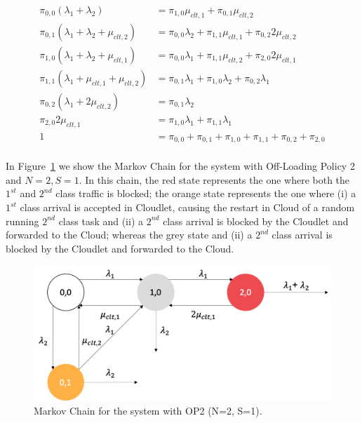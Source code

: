 \begin{equation}
	\begin{split}
		\pi_{0,0}(\lambda_{1}+\lambda_{2})& = \pi_{1,0}\mu_{clt,1}+\pi_{0,1}\mu_{clt,2} \\
		\pi_{0,1}(\lambda_{1}+\lambda_{2}+\mu_{clt,2}) & = \pi_{0,0}\lambda_{2}+\pi_{1,1}\mu_{clt,1}+\pi_{0,2}2\mu_{clt,2} \\
		\pi_{1,0}(\lambda_{1}+\lambda_{2}+\mu_{clt,1}) & = \pi_{0,0}\lambda_{1}+\pi_{1,1}\mu_{clt,2}+\pi_{2,0}2\mu_{clt,1} \\
		\pi_{1,1}(\lambda_{1}+\mu_{clt,1}+\mu_{clt,2}) & = \pi_{0,1}\lambda_{1}+\pi_{1,0}\lambda_{2}+\pi_{0,2}\lambda_{1} \\
		\pi_{0,2}(\lambda_{1}+2\mu_{clt,2}) & = \pi_{0,1}\lambda_{2} \\
		\pi_{2,0}2\mu_{clt,1} & = \pi_{1,0}\lambda_{1}+\pi_{1,1}\lambda_{1} \\
		1 & = \pi_{0,0}+\pi_{0,1}+\pi_{1,0}+\pi_{1,1}+\pi_{0,2}+\pi_{2,0}\\
	\end{split}
	\label{eqn:analytical-model-markov-2}
\end{equation}

In Figure~\ref{fig:analytical-model-markov-2-1} we show the Markov Chain for the system with Off-Loading Policy 2 and $N=2,S=1$. 
In this chain, the red state represents the one where both the $1^{st}$ and $2^{nd}$ class traffic is blocked; the orange state represents the one where (i) a $1^{st}$ class arrival is accepted in Cloudlet, causing the restart in Cloud of a random running $2^{nd}$ class task and (ii) a $2^{nd}$ class arrival is blocked by the Cloudlet and forwarded to the Cloud; whereas the grey state and (ii) a $2^{nd}$ class arrival is blocked by the Cloudlet and forwarded to the Cloud.

\begin{figure}
	\includegraphics[width=\columnwidth]{fig/analytical-model-markov-2-1}
	\caption{Markov Chain for the system with OP2 (N=2, S=1).}
	\label{fig:analytical-model-markov-2-1}
\end{figure}

